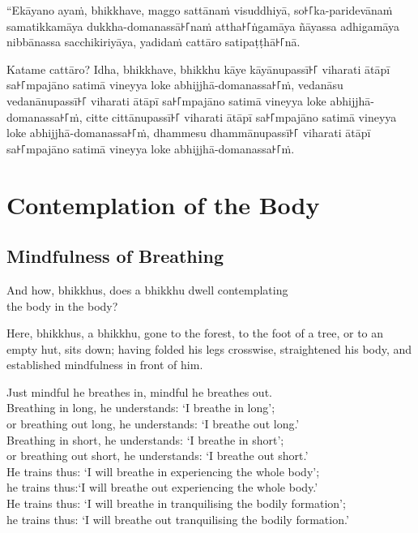 “Ekāyano ayaṁ, bhikkhave, maggo sattānaṁ visuddhiyā, so꜔꜒ka-paridevānaṁ
samatikkamāya dukkha-domanassā꜔꜒naṁ attha꜔꜒ṅgamāya ñāyassa adhigamāya nibbānassa
sacchikiriyāya, yadidaṁ cattāro satipaṭṭhā꜔꜒nā.

Katame cattāro? Idha, bhikkhave, bhikkhu kāye kāyānupassī꜔꜒ viharati ātāpī
sa꜔꜒mpajāno satimā vineyya loke abhijjhā-domanassa꜔꜒ṁ, vedanāsu vedanānupassī꜔꜒
viharati ātāpī sa꜔꜒mpajāno satimā vineyya loke abhijjhā-domanassa꜔꜒ṁ, citte
cittānupassī꜔꜒ viharati ātāpī sa꜔꜒mpajāno satimā vineyya loke abhijjhā-domanassa꜔꜒ṁ,
dhammesu dhammānupassī꜔꜒ viharati ātāpī sa꜔꜒mpajāno satimā vineyya loke
abhijjhā-domanassa꜔꜒ṁ.


\englishPage
\chapter{Contemplation of the Body}

\section{Mindfulness of Breathing}

And how, bhikkhus, does a bhikkhu dwell contemplating\\
the body in the body?

Here, bhikkhus, a bhikkhu, gone to the forest, to the foot of a tree, or to an
empty hut, sits down; having folded his legs crosswise, straightened his body,
and established mindfulness in front of him.

Just mindful he breathes in, mindful he breathes out.\\
Breathing in long, he understands: ‘I breathe in long’;\\
or breathing out long, he understands: ‘I breathe out long.’\\
Breathing in short, he understands: ‘I breathe in short’;\\
or breathing out short, he understands: ‘I breathe out short.’\\
He trains thus: ‘I will breathe in experiencing the whole body’;\\
he trains thus:‘I will breathe out experiencing the whole body.’\\
He trains thus: ‘I will breathe in tranquilising the bodily formation’;\\
he trains thus: ‘I will breathe out tranquilising the bodily formation.’

